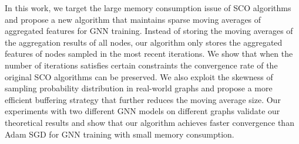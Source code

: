 In this work, we target the large memory consumption issue of SCO algorithms and propose a new algorithm that maintains sparse moving averages of aggregated features for GNN training. 
Instead of storing the moving averages of the aggregation results of all nodes, our algorithm only stores the aggregated features of nodes sampled in the most recent iterations. 
We show that when the number of iterations satisfies certain constraints the convergence rate of the original SCO algorithms can be preserved. 
We also exploit the skewness of sampling probability distribution in real-world graphs and propose a more efficient buffering strategy that further reduces the moving average size. 
Our experiments with two different GNN models on different graphs validate our theoretical results and show that our algorithm achieves faster convergence than Adam SGD for GNN training with small memory consumption. 




















